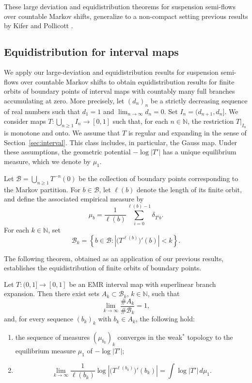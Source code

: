 \documentclass[letterpaper,11pt]{amsart}
\numberwithin{equation}{section}     %
\newcommand{\N}{\mathbb{N}}
\def\N{{\mathbb N}}
\def\B{{\mathcal B}}
\begin{document}
These  large deviation and equidistribution theorems for suspension semi-flows over countable Markov shifts, generalize to a non-compact setting previous results by Kifer \cite{kif}  and Pollicott \cite{po}.



\subsection{Equidistribution for interval maps} \label{intro:interval}

We apply our large-deviation and equidistribution results for suspension semi-flows over countable Markov shifts to obtain equidistribution results for finite orbits of boundary points of interval maps with countably many full branches accumulating at zero. More precisely, let $(d_n)_n$ be a strictly decreasing sequence of real numbers such that $d_1=1$ and $\lim_{n\to\infty}d_n=0$. Set
$I_n=(d_{n+1},d_n]$. We consider maps $T:\bigcup_{n\geq 1} I_n \to [0,1]$ such that, for each $n \in \N$, the restriction $T|_{I_n}$ is monotone and onto. We assume that $T$ is regular and expanding in the sense of Section~\ref{sec:interval}. This class includes, in particular, the Gauss map. Under these assumptions, the geometric potential $-\log |T'|$ has a unique equilibrium measure, which we denote by $\mu_1$.


Let $\B= \bigcup_{n \geq 1} T^{-n}(0)$ be the collection of boundary points corresponding to the Markov partition.  For $b\in\mathcal B$, let $\ell(b)$ denote the length of its finite orbit, and define the associated empirical measure by
\[
\mu_b=
\frac{1}{\ell(b)}
\sum_{i=0}^{\ell(b)-1}\delta_{T^i b}.
\]
For each $k\in\mathbb N$, set
\[
\mathcal B_k=
\left\{
b\in\mathcal B:
\left|\big(T^{\ell(b)}\big)'(b)\right|<k
\right\}.
\]



The following theorem, obtained as an application of our previous results, establishes the equidistribution of finite orbits of boundary points.

\begin{theorem}\label{main:interval}
Let $T:(0,1]\to [0,1]$ be an EMR interval map with superlinear branch expansion. Then there exist sets $A_k\subset \mathcal B_k$, $k\in\mathbb N$, such that
\[
\lim_{k\to\infty}\frac{\#A_k}{\#\mathcal B_k}=1,
\]
and, for every sequence $(b_k)_k$ with $b_k\in A_k$, the following hold:
\begin{enumerate}
    \item[(1)] the sequence of measures $(\mu_{b_k})_k$ converges in the weak$^\ast$ topology to the equilibrium measure $\mu_1$ of $-\log |T'|$;
    \item[(2)]
    \[
    \lim_{k\to\infty}
    \frac{1}{\ell(b_k)}
    \log \left|\big(T^{\ell(b_k)}\big)'(b_k)\right|
    =
    \int \log |T'|\,d\mu_1.
    \]
\end{enumerate}
\end{theorem}
\end{document}
